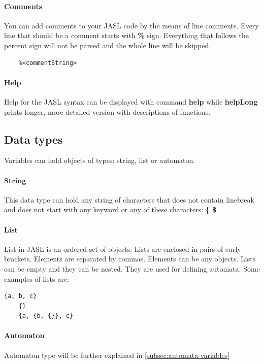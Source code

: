 \documentclass{ctuthesis}
\begin{document}
\paragraph{Comments}
You can add comments to your JASL code by the means of line comments. Every line that should be a comment starts with \textbf{\%} sign. Everything that follows the percent sign will not be parsed and the whole line will be skipped. 
\begin{verbatim}
	%<commentString>
\end{verbatim}

\paragraph{Help}
Help for the JASL syntax can be displayed with command \textbf{help} while \textbf{helpLong} prints longer, more detailed version with descriptions of functions. 

\subsection{Data types}
Variables can hold objects of types: string, list or automaton.
\paragraph{String} This data type can hold any string of characters that does not contain linebreak and does not start with any keyword or any of these characters: \textbf{\{ \$}

\paragraph{List}
List in JASL is an ordered set of objects. Lists are enclosed in pairs of curly brackets. Elements are separated by commas. Elements can be any objects. Lists can be empty and they can be nested. They are used for defining automata. Some examples of lists are:

\begin{minipage}{\linewidth}
\begin{lstlisting}[language = JASL_snippet]
	{a, b, c}
	{}
	{a, {b, {}}, c}
\end{lstlisting}
\end{minipage}

\paragraph{Automaton}
Automaton type will be further explained in \ref{subsec:automata-variables}
\end{document}
